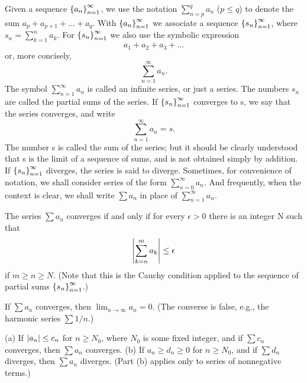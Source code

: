 \begin{definition} %
  \label{def:chap3:series_convergence}
  Given a sequence $\left\{ a_n \right\}_{n=1}^\infty$, we use the notation $\sum_{n=p}^q
  a_n$ ($p \le q$) to denote the sum $a_p + a_{p+1} + \dots + a_q$.
  With $\left\{ a_n \right\}_{n=1}^\infty$ we associate a sequence $\left\{ s_n \right\}_{n=1}^\infty$, where
  $s_n = \sum_{k=1}^n a_k$. For $\left\{ s_n \right\}_{n=1}^\infty$ we also use the
  symbolic expression
  \[ a_1 + a_2 + a_3 + \dots \]
  or, more concisely,
  \[ \sum_{n=1}^\infty a_n. \]
  The symbol $\sum_{n=1}^\infty a_n$ is called an infinite series, or
  just a series. The numbers $s_n$ are called the partial sums of the
  series. If $\left\{ s_n \right\}_{n=1}^\infty$ converges to s, we say that the series
  converges, and write
  \[ \sum_{n=1}^\infty a_n = s. \]
  The number s is called the sum of the series; but it should be
  clearly understood that s is the limit of a sequence of sums, and
  is not obtained simply by addition.
  If $\left\{ s_n \right\}_{n=1}^\infty$ diverges, the series is said to diverge.
  Sometimes, for convenience of notation, we shall consider series of
  the form $\sum_{n=0}^\infty a_n$. And frequently, when the context
  is clear, we shall write $\sum a_n$ in place of $\sum_{n=1}^\infty a_n$.
\end{definition}

\begin{theorem} %
  \label{thm:chap3:cauchy_series}
  The series $\sum a_n$ converges if and only if for every $\epsilon
  > 0$ there is an integer N such that
  \[ \left\lvert  \sum_{k=n}^m a_k  \right\rvert \le \epsilon \]
  if $m \ge n \ge N$.
  (Note that this is the Cauchy condition applied to the sequence of
  partial sums $\left\{ s_n \right\}_{n=1}^\infty$.)
\end{theorem}

\begin{theorem} %
  \label{thm:chap3:term_test_divergence}
  If $\sum a_n$ converges, then $\lim_{n \to \infty} a_n = 0$.
  (The converse is false, e.g., the harmonic series $\sum 1/n$.)
\end{theorem}

\begin{theorem} %
  \label{thm:chap3:comparison_test}
  (a) If $\left\lvert a_n \right\rvert \le c_n$ for $n \ge N_0$, where $N_0$ is some
  fixed integer, and if $\sum c_n$ converges, then $\sum a_n$ converges.
  (b) If $a_n \ge d_n \ge 0$ for $n \ge N_0$, and if $\sum d_n$
  diverges, then $\sum a_n$ diverges.
  (Part (b) applies only to series of nonnegative terms.)
\end{theorem}

